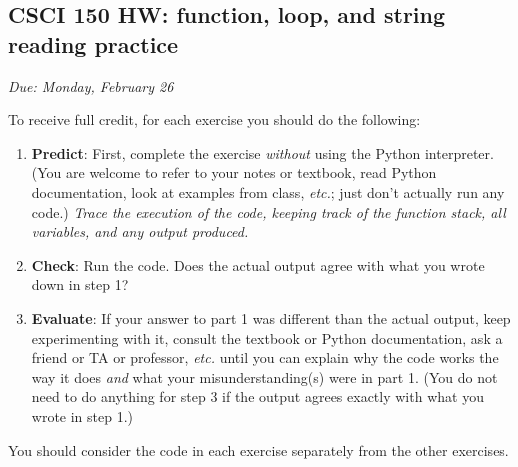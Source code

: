 \documentclass[]{article}
\date{}
\begin{document}
\subsection{CSCI 150 HW: function, loop, and string reading
practice}\label{csci-150-hw-function-loop-and-string-reading-practice}

\emph{Due: Monday, February 26}

To receive full credit, for each exercise you should do the following:

\begin{enumerate}
\def\labelenumi{\arabic{enumi}.}
\item
  \textbf{Predict}: First, complete the exercise \emph{without} using
  the Python interpreter. (You are welcome to refer to your notes or
  textbook, read Python documentation, look at examples from class,
  \emph{etc.}; just don't actually run any code.) \emph{Trace the
  execution of the code, keeping track of the function stack, all
  variables, and any output produced.}
\item
  \textbf{Check}: Run the code. Does the actual output agree with what
  you wrote down in step 1?
\item
  \textbf{Evaluate}: If your answer to part 1 was different than the
  actual output, keep experimenting with it, consult the textbook or
  Python documentation, ask a friend or TA or professor, \emph{etc.}
  until you can explain why the code works the way it does \emph{and}
  what your misunderstanding(s) were in part 1. (You do not need to do
  anything for step 3 if the output agrees exactly with what you wrote
  in step 1.)
\end{enumerate}

You should consider the code in each exercise separately from the other
exercises.
\end{document}
